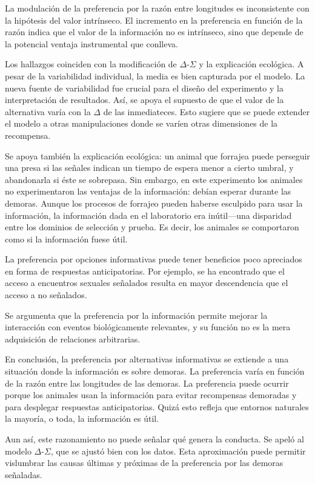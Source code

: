 \documentclass[a4paper,12pt]{article}
\begin{document}
La modulación de la preferencia por la razón entre longitudes es inconsistente con la hipótesis del valor intrínseco.
El incremento en la preferencia en función de la razón indica que el valor de la información no es intrínseco, sino que depende de la potencial ventaja instrumental que conlleva.

Los hallazgos coinciden con la modificación de $\Delta$-$\Sigma$ y la explicación ecológica.
A pesar de la variabilidad individual, la media es bien capturada por el modelo.
La nueva fuente de variabilidad fue crucial para el diseño del experimento y la interpretación de resultados.
Así, se apoya el supuesto de que el valor de la alternativa varía con la $\Delta$ de las inmediateces.
Esto sugiere que se puede extender el modelo a otras manipulaciones donde se varíen otras dimensiones de la recompensa.

Se apoya también la explicación ecológica: un animal que forrajea puede perseguir una presa si las señales indican un tiempo de espera menor a cierto umbral, y abandonarla si éste se sobrepasa.
Sin embargo, en este experimento los animales no experimentaron las ventajas de la información: debían esperar durante las demoras.
Aunque los procesos de forrajeo pueden haberse esculpido para usar la información, la información dada en el laboratorio era inútil---una disparidad entre los dominios de selección y prueba.
Es decir, los animales se comportaron como si la información fuese útil.

La preferencia por opciones informativas puede tener beneficios poco apreciados en forma de respuestas anticipatorias.
Por ejemplo, se ha encontrado que el acceso a encuentros sexuales señalados resulta en mayor descendencia que el acceso a no señalados.

Se argumenta que la preferencia por la información permite mejorar la interacción con eventos biológicamente relevantes, y su función no es la mera adquisición de relaciones arbitrarias.

En conclusión, la preferencia por alternativas informativas se extiende a una situación donde la información es sobre demoras.
La preferencia varía en función de la razón entre las longitudes de las demoras.
La preferencia puede ocurrir porque los animales usan la información para evitar recompensas demoradas y para desplegar respuestas anticipatorias.
Quizá esto refleja que entornos naturales la mayoría, o toda, la información es útil.

Aun así, este razonamiento no puede señalar qué genera la conducta.
Se apeló al modelo $\Delta$-$\Sigma$, que se ajustó bien con los datos.
Esta aproximación puede permitir vislumbrar las causas últimas y próximas de la preferencia por las demoras señaladas.
\end{document}
